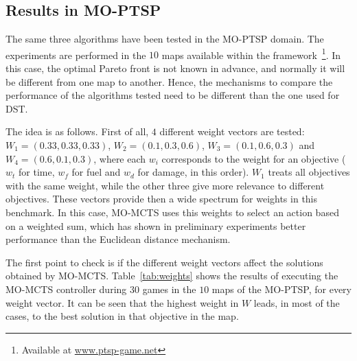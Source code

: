 \documentclass[journal]{IEEEtran}
\begin{document}
\subsection{Results in MO-PTSP} \label{ssec:resMOPTSP}

The same three algorithms have been tested in the MO-PTSP domain. The experiments are performed in the $10$ maps available within the framework~\footnote{Available at \url{www.ptsp-game.net}}. In this case, the optimal Pareto front is not known in advance, and normally it will be different from one map to another. Hence, the mechanisms to compare the performance of the algorithms tested need to be different than the one used for DST.

The idea is as follows. First of all, $4$ different weight vectors are tested: $W_1 = (0.33,0.33,0.33)$, $W_2 = (0.1,0.3,0.6)$, $W_3 = (0.1,0.6,0.3)$ and $W_4 = (0.6,0.1,0.3)$, where each $w_i$ corresponds to the weight for an objective ($w_t$ for time, $w_f$ for fuel and $w_d$ for damage, in this order). $W_1$ treats all objectives with the same weight, while the other three give more relevance to different objectives. These vectors provide then a wide spectrum for weights in this benchmark. In this case, MO-MCTS uses this weights to select an action based on a weighted sum, which has shown in preliminary experiments better performance than the Euclidean distance mechanism.

The first point to check is if the different weight vectors affect the solutions obtained by MO-MCTS. Table~\ref{tab:weights} shows the results of executing the MO-MCTS controller during $30$ games in the $10$ maps of the MO-PTSP, for every weight vector. It can be seen that the highest weight in $W$ leads, in most of the cases, to the best solution in that objective in the map. 
\end{document}
